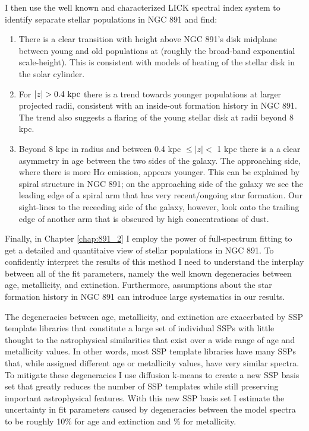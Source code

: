 I then use the well known and characterized LICK spectral index system
to identify separate stellar populations in NGC 891 and find:
\begin{enumerate}

\item There is a clear transition with height above NGC 891's disk
  midplane between young and old populations at 
  (roughly the broad-band exponential scale-height). This is
  consistent with models of heating of the stellar disk in the solar
  cylinder.

  \item For $|z| > 0.4~\mathrm{kpc} $ there is a trend towards younger
    populations at larger projected radii, consistent with an
    inside-out formation history in NGC 891. The trend also suggests a
    flaring of the young stellar disk at radii beyond 8 kpc.

  \item Beyond 8 kpc in radius and between 0.4 kpc $\leq |z| <$ 1 kpc
    there is a a clear asymmetry in age between the two sides of the
    galaxy. The approaching side, where there is more H$\alpha$
    emission, appears younger. This can be explained by spiral
    structure in NGC 891; on the approaching side of the galaxy we see
    the leading edge of a spiral arm that has very recent/ongoing star
    formation. Our sight-lines to the receeding side of the galaxy,
    however, look onto the trailing edge of another arm that is
    obscured by high concentrations of dust.

\end{enumerate}

Finally, in Chapter \ref{chap:891_2} I employ the power of
full-spectrum fitting to get a detailed and quantitaive view of
stellar populations in NGC 891. To confidently interpret the results
of this method I need to understand the interplay between all of the
fit parameters, namely the well known degeneracies between age,
metallicity, and extinction. Furthermore, assumptions about the star
formation history in NGC 891 can introduce large systematics in our
results.

The degeneracies between age, metallicity, and extinction are
exacerbated by SSP template libraries that constitute a large set of
individual SSPs with little thought to the astrophysical similarities
that exist over a wide range of age and metallicity values. In other
words, most SSP template libraries have many SSPs that, while assigned
different age or metallicity values, have very similar spectra. To
mitigate these degeneracies I use diffusion k-means to create a new
SSP basis set that greatly reduces the number of SSP templates while
still preserving important astrophysical features. With this new SSP
basis set I estimate the uncertainty in fit parameters caused by
degeneracies between the model spectra to be roughly 10\% for age and
extinction and \% for metallicity.

